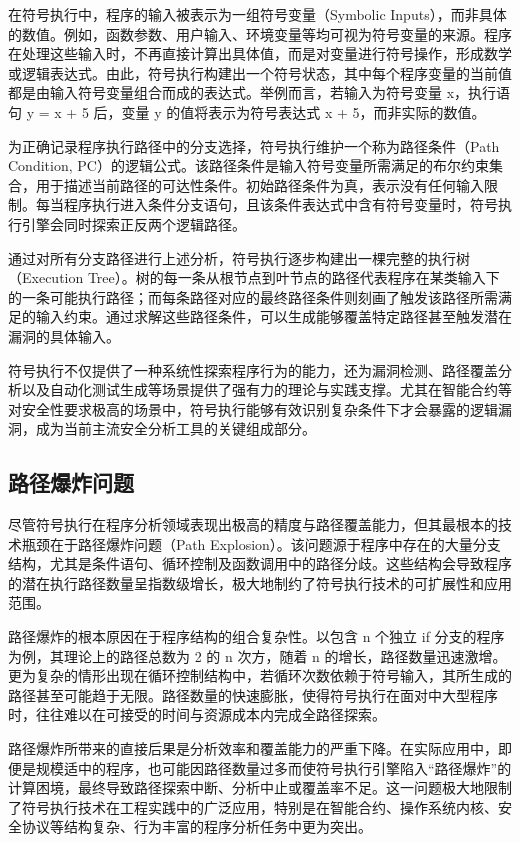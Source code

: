 \documentclass[print, master, vlined, timesmath]{DissertUESTC}
\begin{document}
在符号执行中，程序的输入被表示为一组符号变量（Symbolic Inputs），而非具体的数值。例如，函数参数、用户输入、环境变量等均可视为符号变量的来源。程序在处理这些输入时，不再直接计算出具体值，而是对变量进行符号操作，形成数学或逻辑表达式。由此，符号执行构建出一个符号状态，其中每个程序变量的当前值都是由输入符号变量组合而成的表达式。举例而言，若输入为符号变量 x，执行语句 y = x + 5 后，变量 y 的值将表示为符号表达式 x + 5，而非实际的数值。

为正确记录程序执行路径中的分支选择，符号执行维护一个称为路径条件（Path Condition, PC）的逻辑公式。该路径条件是输入符号变量所需满足的布尔约束集合，用于描述当前路径的可达性条件。初始路径条件为真，表示没有任何输入限制。每当程序执行进入条件分支语句，且该条件表达式中含有符号变量时，符号执行引擎会同时探索正反两个逻辑路径。

通过对所有分支路径进行上述分析，符号执行逐步构建出一棵完整的执行树（Execution Tree）。树的每一条从根节点到叶节点的路径代表程序在某类输入下的一条可能执行路径；而每条路径对应的最终路径条件则刻画了触发该路径所需满足的输入约束。通过求解这些路径条件，可以生成能够覆盖特定路径甚至触发潜在漏洞的具体输入。

符号执行不仅提供了一种系统性探索程序行为的能力，还为漏洞检测、路径覆盖分析以及自动化测试生成等场景提供了强有力的理论与实践支撑。尤其在智能合约等对安全性要求极高的场景中，符号执行能够有效识别复杂条件下才会暴露的逻辑漏洞，成为当前主流安全分析工具的关键组成部分。

\subsection{路径爆炸问题}

尽管符号执行在程序分析领域表现出极高的精度与路径覆盖能力，但其最根本的技术瓶颈在于路径爆炸问题（Path Explosion）。该问题源于程序中存在的大量分支结构，尤其是条件语句、循环控制及函数调用中的路径分歧。这些结构会导致程序的潜在执行路径数量呈指数级增长，极大地制约了符号执行技术的可扩展性和应用范围。

路径爆炸的根本原因在于程序结构的组合复杂性。以包含 n 个独立 if 分支的程序为例，其理论上的路径总数为 2 的 n 次方，随着 n 的增长，路径数量迅速激增。更为复杂的情形出现在循环控制结构中，若循环次数依赖于符号输入，其所生成的路径甚至可能趋于无限。路径数量的快速膨胀，使得符号执行在面对中大型程序时，往往难以在可接受的时间与资源成本内完成全路径探索。

路径爆炸所带来的直接后果是分析效率和覆盖能力的严重下降。在实际应用中，即便是规模适中的程序，也可能因路径数量过多而使符号执行引擎陷入“路径爆炸”的计算困境，最终导致路径探索中断、分析中止或覆盖率不足。这一问题极大地限制了符号执行技术在工程实践中的广泛应用，特别是在智能合约、操作系统内核、安全协议等结构复杂、行为丰富的程序分析任务中更为突出。
\end{document}
